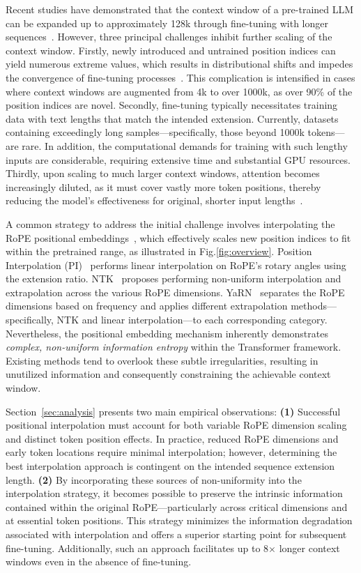 Recent studies have demonstrated that the context window of a pre-trained LLM can be expanded up to approximately 128k through fine-tuning with longer sequences~\cite{longlora,pi,yarn,zhang2024soaring,liu2023scaling}. However, three principal challenges inhibit further scaling of the context window. Firstly, newly introduced and untrained position indices can yield numerous extreme values, which results in distributional shifts and impedes the convergence of fine-tuning processes~\cite{pi}. This complication is intensified in cases where context windows are augmented from 4k to over 1000k, as over 90\% of the position indices are novel. Secondly, fine-tuning typically necessitates training data with text lengths that match the intended extension. Currently, datasets containing exceedingly long samples—specifically, those beyond 1000k tokens—are rare. In addition, the computational demands for training with such lengthy inputs are considerable, requiring extensive time and substantial GPU resources. Thirdly, upon scaling to much larger context windows, attention becomes increasingly diluted, as it must cover vastly more token positions, thereby reducing the model’s effectiveness for original, shorter input lengths~\cite{pi}.

A common strategy to address the initial challenge involves interpolating the RoPE positional embeddings~\cite{rope,pi}, which effectively scales new position indices to fit within the pretrained range, as illustrated in Fig.\ref{fig:overview}. Position Interpolation (PI)~\cite{pi} performs linear interpolation on RoPE's rotary angles using the extension ratio. NTK~\cite{ntk,dynamicntk} proposes performing non-uniform interpolation and extrapolation across the various RoPE dimensions. YaRN~\cite{yarn} separates the RoPE dimensions based on frequency and applies different extrapolation methods—specifically, NTK and linear interpolation—to each corresponding category. Nevertheless, the positional embedding mechanism inherently demonstrates \emph{complex, non-uniform information entropy} within the Transformer framework. Existing methods tend to overlook these subtle irregularities, resulting in unutilized information and consequently constraining the achievable context window.

Section~\ref{sec:analysis} presents two main empirical observations: \textbf{(1)} Successful positional interpolation must account for both variable RoPE dimension scaling and distinct token position effects. In practice, reduced RoPE dimensions and early token locations require minimal interpolation; however, determining the best interpolation approach is contingent on the intended sequence extension length. \textbf{(2)} By incorporating these sources of non-uniformity into the interpolation strategy, it becomes possible to preserve the intrinsic information contained within the original RoPE—particularly across critical dimensions and at essential token positions. This strategy minimizes the information degradation associated with interpolation and offers a superior starting point for subsequent fine-tuning. Additionally, such an approach facilitates up to 8$\times$ longer context windows even in the absence of fine-tuning.


